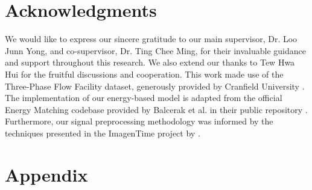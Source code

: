 \documentclass{article}
\begin{document}
\section*{Acknowledgments}
We would like to express our sincere gratitude to our main supervisor, Dr. Loo Junn Yong, and co-supervisor, Dr. Ting Chee Ming, for their invaluable guidance and support throughout this research. We also extend our thanks to Tew Hwa Hui for the fruitful discussions and cooperation.
This work made use of the Three-Phase Flow Facility dataset, generously provided by Cranfield University \citep{cao_mba_lao_samuel_2015}. The implementation of our energy-based model is adapted from the official Energy Matching codebase provided by Balcerak et al. in their public repository \citep{balcerak2025energymatchingunifyingflow}. Furthermore, our signal preprocessing methodology was informed by the techniques presented in the ImagenTime project by \cite{naiman_berman_pemper_arbiv_fadlon_azencot_2024}. 




\newpage
\section*{Appendix}

\end{document}

